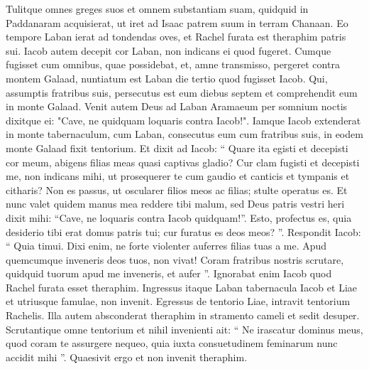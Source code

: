 \begin{biblechapter}
\begin{biblechapter}
\begin{biblechapter}
\begin{biblechapter}
\begin{biblechapter}
\begin{biblechapter}
\begin{biblechapter}
\begin{biblechapter}
\begin{biblechapter}
\begin{biblechapter}
\begin{biblechapter}
\begin{biblechapter}
\begin{biblechapter}
\begin{biblechapter}
\begin{biblechapter}
\begin{biblechapter}
\begin{biblechapter}
\begin{biblechapter}
\begin{biblechapter}
\begin{biblechapter}
\begin{biblechapter}
\begin{biblechapter}
\begin{biblechapter}
\begin{biblechapter}
\begin{biblechapter}
\begin{biblechapter}
\begin{biblechapter}
\begin{biblechapter}
\begin{biblechapter}
\begin{biblechapter}
\begin{biblechapter}
\verse Tulitque omnes greges suos et omnem substantiam suam, quidquid in Paddanaram acquisierat, ut iret ad Isaac patrem suum in terram Chanaan.
 \verse Eo tempore Laban ierat ad tondendas oves, et Rachel furata est theraphim patris sui. 
\verse Iacob autem decepit cor Laban, non indicans ei quod fugeret.
 \verse Cumque fugisset cum omnibus, quae possidebat, et, amne transmisso, pergeret contra montem Galaad, 
\verse nuntiatum est Laban die tertio quod fugisset Iacob. 
 \verse Qui, assumptis fratribus suis, persecutus est eum diebus septem et comprehendit eum in monte Galaad. 
\verse Venit autem Deus ad Laban Aramaeum per somnium noctis dixitque ei: "Cave, ne quidquam loquaris contra Iacob!".
 \verse Iamque Iacob extenderat in monte tabernaculum, cum Laban, consecutus eum cum fratribus suis, in eodem monte Galaad fixit tentorium. 
\verse Et dixit ad Iacob: “ Quare ita egisti et decepisti cor meum, abigens filias meas quasi captivas gladio? 
\verse Cur clam fugisti et decepisti me, non indicans mihi, ut prosequerer te cum gaudio et canticis et tympanis et citharis? 
\verse Non es passus, ut oscularer filios meos ac filias; stulte operatus es. Et nunc 
\verse valet quidem manus mea reddere tibi malum, sed Deus patris vestri heri dixit mihi: “Cave, ne loquaris contra Iacob quidquam!”. 
\verse Esto, profectus es, quia desiderio tibi erat domus patris tui; cur furatus es deos meos? ”.
 \verse Respondit Iacob: “ Quia timui. Dixi enim, ne forte violenter auferres filias tuas a me. 
\verse Apud quemcumque inveneris deos tuos, non vivat! Coram fratribus nostris scrutare, quidquid tuorum apud me inveneris, et aufer ”. Ignorabat enim Iacob quod Rachel furata esset theraphim.
 \verse Ingressus itaque Laban tabernacula Iacob et Liae et utriusque famulae, non invenit. Egressus de tentorio Liae, intravit tentorium Rachelis. 
\verse Illa autem absconderat theraphim in stramento cameli et sedit desuper. Scrutantique omne tentorium et nihil invenienti 
\verse ait: “ Ne irascatur dominus meus, quod coram te assurgere nequeo, quia iuxta consuetudinem feminarum nunc accidit mihi ”. Quaesivit ergo et non invenit theraphim.

\end{biblechapter}
\end{biblechapter}
\end{biblechapter}
\end{biblechapter}
\end{biblechapter}
\end{biblechapter}
\end{biblechapter}
\end{biblechapter}
\end{biblechapter}
\end{biblechapter}
\end{biblechapter}
\end{biblechapter}
\end{biblechapter}
\end{biblechapter}
\end{biblechapter}
\end{biblechapter}
\end{biblechapter}
\end{biblechapter}
\end{biblechapter}
\end{biblechapter}
\end{biblechapter}
\end{biblechapter}
\end{biblechapter}
\end{biblechapter}
\end{biblechapter}
\end{biblechapter}
\end{biblechapter}
\end{biblechapter}
\end{biblechapter}
\end{biblechapter}
\end{biblechapter}
